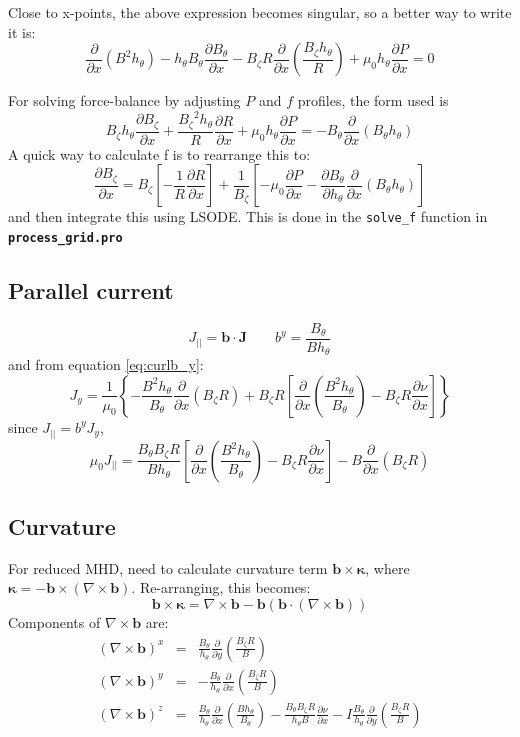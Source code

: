 \documentclass[12pt, a4paper]{article}
\newcommand{\code}[1]{\texttt{#1}}
\newcommand{\file}[1]{\texttt{\bf #1}}
\newcommand{\deriv}[2]{\ensuremath{\frac{\partial #1}{\partial #2}}}
\newcommand{\hthe}{\ensuremath{h_\theta}}
\newcommand{\Bp}{\ensuremath{B_\theta}}
\newcommand{\Bt}{\ensuremath{B_\zeta}}
\newcommand{\Vec}[1]{\ensuremath{\mathbf{#1}}}
\newcommand{\Jvec}{\Vec{J}}
\begin{document}
Close to x-points, the above expression becomes singular, so a better way to write it is:
\[
\deriv{}{x}\left(B^2\hthe\right) - \hthe\Bp\deriv{\Bp}{x} - \Bt R\deriv{}{x}\left(\frac{\Bt\hthe}{R}\right) + \mu_0\hthe\deriv{P}{x} = 0
\]

For solving force-balance by adjusting $P$ and $f$ profiles, the form used is
\[
\Bt\hthe\deriv{\Bt}{x} + \frac{\Bt^2\hthe}{R}\deriv{R}{x} + \mu_0\hthe\deriv{P}{x} = -\Bp\deriv{}{x}\left(\Bp\hthe\right)
\]
A quick way to calculate f is to rearrange this to:
\[
\deriv{\Bt}{x} = \Bt\left[-\frac{1}{R}\deriv{R}{x}\right] + \frac{1}{\Bt}\left[-\mu_0\deriv{P}{x} - \deriv{\Bp}{\hthe}\deriv{}{x}\left(\Bp\hthe\right)\right]
\]
and then integrate this using LSODE. This is done in the \code{solve\_f} function in \file{process\_grid.pro}

\subsection{Parallel current}

\[
J_{||} = \mathbf{b}\cdot\Jvec \qquad b^y = \frac{\Bp}{B\hthe}
\]
and from equation \ref{eq:curlb_y}:
\[
J_y = \frac{1}{\mu_0}\left\{-\frac{B^2\hthe}{\Bp}\deriv{}{x}\left(\Bt R\right) + \Bt R\left[\deriv{}{x}\left(\frac{B^2\hthe}{\Bp}\right) - \Bt R\deriv{\nu}{x}\right]\right\}
\]
since $J_{||} = b^yJ_y$,
\[
\mu_0 J_{||} =\frac{\Bp\Bt R}{B\hthe}\left[\deriv{}{x}\left(\frac{B^2\hthe}{\Bp}\right) - \Bt R\deriv{\nu}{x}\right] - B\deriv{}{x}\left(\Bt R\right)
\]

\subsection{Curvature}

For reduced MHD, need to calculate curvature term $\mathbf{b}\times\mathbf{\kappa}$, where
$\mathbf{\kappa} = -\mathbf{b}\times\left(\nabla\times\mathbf{b}\right)$. Re-arranging, this becomes:
\[
\mathbf{b}\times\mathbf{\kappa} = \nabla\times\mathbf{b} - \mathbf{b}\left(\mathbf{b}\cdot\left(\nabla\times\mathbf{b}\right)\right)
\]
Components of $\nabla\times\mathbf{b}$ are:
\begin{eqnarray*}
\left(\nabla\times\mathbf{b}\right)^x &=& \frac{\Bp}{\hthe}\deriv{}{y}\left(\frac{\Bt R}{B}\right) \\
\left(\nabla\times\mathbf{b}\right)^y &=& -\frac{\Bp}{\hthe}\deriv{}{x}\left(\frac{\Bt R}{B}\right) \\
\left(\nabla\times\mathbf{b}\right)^z &=& \frac{\Bp}{\hthe}\deriv{}{x}\left(\frac{B\hthe}{\Bp}\right) - \frac{\Bp\Bt R}{\hthe B}\deriv{\nu}{x} - I\frac{\Bp}{\hthe}\deriv{}{y}\left(\frac{\Bt R}{B}\right) \\
\end{eqnarray*}
\end{document}
